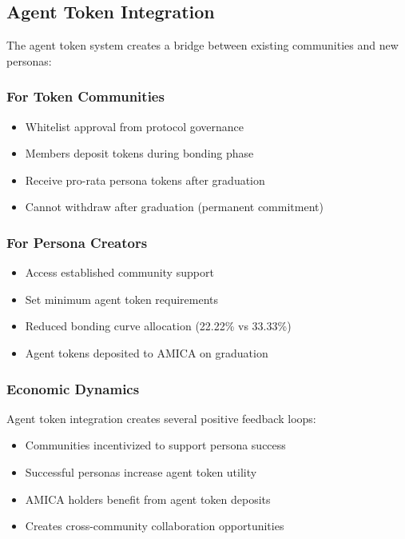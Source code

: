 \documentclass{article}
\begin{document}
\subsection{Agent Token Integration}

The agent token system creates a bridge between existing communities and new personas:

\subsubsection{For Token Communities}
\begin{itemize}
    \item Whitelist approval from protocol governance
    \item Members deposit tokens during bonding phase
    \item Receive pro-rata persona tokens after graduation
    \item Cannot withdraw after graduation (permanent commitment)
\end{itemize}

\subsubsection{For Persona Creators}
\begin{itemize}
    \item Access established community support
    \item Set minimum agent token requirements
    \item Reduced bonding curve allocation (22.22\% vs 33.33\%)
    \item Agent tokens deposited to AMICA on graduation
\end{itemize}

\subsubsection{Economic Dynamics}
Agent token integration creates several positive feedback loops:
\begin{itemize}
    \item Communities incentivized to support persona success
    \item Successful personas increase agent token utility
    \item AMICA holders benefit from agent token deposits
    \item Creates cross-community collaboration opportunities
\end{itemize}
\end{document}
